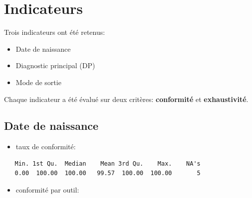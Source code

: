 \documentclass[]{article}
\begin{document}
\section{Indicateurs}\label{indicateurs}

Trois indicateurs ont été retenus:

\begin{itemize}
\itemsep1pt\parskip0pt
\item
  Date de naissance
\item
  Diagnostic principal (DP)
\item
  Mode de sortie
\end{itemize}

Chaque indicateur a été évalué sur deux critères: \textbf{conformité} et
\textbf{exhaustivité}.

\subsection{Date de naissance}\label{date-de-naissance}

\begin{itemize}
\itemsep1pt\parskip0pt
\item
  taux de conformité:
\end{itemize}

\begin{verbatim}
   Min. 1st Qu.  Median    Mean 3rd Qu.    Max.    NA's 
   0.00  100.00  100.00   99.57  100.00  100.00       5 
\end{verbatim}

\begin{itemize}
\itemsep1pt\parskip0pt
\item
  conformité par outil:
\end{itemize}
\end{document}
